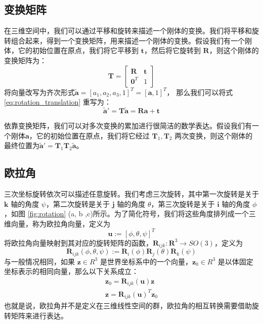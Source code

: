 \subsection{变换矩阵}
在三维空间中，我们可以通过平移和旋转来描述一个刚体的变换。我们将平移和旋转组合起来，得到一个变换矩阵，用来描述一个刚体的变换。假设我们有一个刚体，它的初始位置在原点，我们将它平移到 $\boldsymbol{t}$，然后将它旋转到 $\boldsymbol{R}$，则这个刚体的变换矩阵为：
\begin{equation}
    \boldsymbol{T} = 
    \begin{bmatrix}
    \boldsymbol{R} & \boldsymbol{t} \\
    \boldsymbol{0}^T & 1
    \end{bmatrix}
\end{equation}
将向量改写为齐次形式$\widetilde{\boldsymbol{a}} = [a_1, a_2, a_3, 1]^T = [\boldsymbol{a}, 1]^T$， 那么我们可以将式 \ref{eq:rotation_translation} 重写为：
\begin{equation}
    \widetilde{\boldsymbol{a}}' = \boldsymbol{T} \widetilde{\boldsymbol{a}} = \boldsymbol{R} \boldsymbol{a} + \boldsymbol{t}
\end{equation}  

依靠变换矩阵，我们可以对多次变换的累加进行很简洁的数学表达。假设我们有一个刚体$\boldsymbol{a}$，它的初始位置在原点，我们将它经过 $\boldsymbol{T}_1, \boldsymbol{T}_2$ 两次变换，则这个刚体的最终位置为$\widetilde{\boldsymbol{a}}' = \boldsymbol{T}_1 \boldsymbol{T}_2 \widetilde{\boldsymbol{a}}$。

\subsection{欧拉角}
三次坐标旋转依次可以描述任意旋转。我们考虑三次旋转，其中第一次旋转是关于 $\boldsymbol{k}$ 轴的角度 $\psi$，第二次旋转是关于 $\boldsymbol{j}$ 轴的角度 $\theta$，第三次旋转是关于 $\boldsymbol{i}$ 轴的角度 $\phi$，如图 \ref{fig:rotation} (a, b ,c)所示。为了简化符号，我们将这些角度排列成一个三维向量，称为欧拉角向量，定义为 
\begin{equation}
    \boldsymbol{u} := [\phi, \theta, \psi]^T
\end{equation}
将欧拉角向量映射到其对应的旋转矩阵的函数，$\boldsymbol{R}_{ijk} : \boldsymbol{R}^3 \to SO(3)$，定义为
\begin{equation}
    \boldsymbol{R}_{ijk}(\phi, \theta, \psi) := \boldsymbol{R}_i(\phi)\boldsymbol{R}_j(\theta)\boldsymbol{R}_k(\psi)
\end{equation}
与一般情况相同，如果 $\boldsymbol{z} \in R^3$ 是世界坐标系中的一个向量，$\boldsymbol{z}_0 \in R^3$ 是以体固定坐标表示的相同向量，那么以下关系成立：
\begin{align}
    \boldsymbol{z}_0 = \boldsymbol{R}_{ijk}(\boldsymbol{u}) \boldsymbol{z} \\
    \boldsymbol{z} = \boldsymbol{R}_{ijk}(\boldsymbol{u})^T \boldsymbol{z}_0
\end{align}
也就是说，欧拉角并不是定义在三维线性空间的群，欧拉角的相互转换需要借助旋转矩阵来进行表达。

